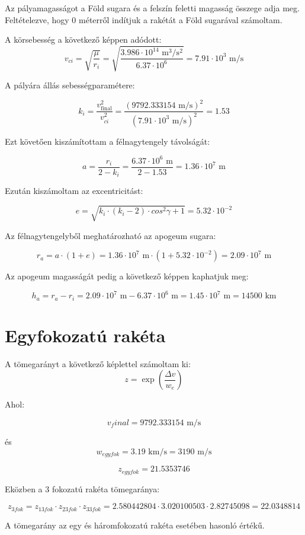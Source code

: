 \documentclass[a4paper,12pt]{article}
\begin{document}
Az pályamagasságot a Föld sugara és a felszín feletti magasság összege adja meg. Feltételezve, hogy 0 méterről indítjuk a rakétát a Föld sugarával számoltam.

A körsebesség a következő képpen adódott:
\[
  v_{ci} = \sqrt{\frac{\mu}{r_i}} = \sqrt{\frac{3.986 \cdot 10^{14} \text{ m}^3/\text{s}^2}{6.37 \cdot 10^6}} = 7.91 \cdot 10^3 \text{ m/s}
\]

A pályára állás sebességparamétere:

\[
  k_i = \frac{v_{\text{final}}^2}{v_{ci}^2} = \frac{(9792.333154 \text{ m/s})^2}{(7.91 \cdot 10^3 \text{ m/s})^2} = 1.53
\]

Ezt követően kiszámítottam a félnagytengely távolságát:

\[
  a = \frac{r_i}{2 - k_i} = \frac{6.37 \cdot 10^6 \text{ m}}{2 - 1.53 } = 1.36 \cdot 10^7 \text{ m}
\]

Ezután kiszámoltam az excentricitást:

\[
  e = \sqrt{k_i \cdot (k_i - 2) \cdot cos^2\gamma + 1} = 5.32 \cdot 10^{-2}
\]

Az félnagytengelyből meghatározható az apogeum sugara:

\[
  r_a = a \cdot (1 + e) = 1.36 \cdot 10^7 \text{ m} \cdot (1 + 5.32 \cdot 10^{-2}) = 2.09 \cdot 10^7 \text{ m}
\]

Az apogeum magasságát pedig a következő képpen kaphatjuk meg:

\[
  h_a = r_a - r_i = 2.09 \cdot 10^7 \text{ m} - 6.37 \cdot 10^6 \text{ m} = 1.45 \cdot 10^7 \text{ m} = 14500 \text{ km}
\]


\section{Egyfokozatú rakéta}

A tömegarányt a következő képlettel számoltam ki:
\[
z = \exp\left(\frac{\Delta v}{w_e}\right)
\]

Ahol:

\[
v_final = 9792.333154 \text{ m/s}
\]

és
\[
w_{egyfok} = 3.19 \text{ km/s} = 3190 \text{ m/s}
\]

\[
z_{egyfok} = 21.5353746
\]

Eközben a 3 fokozatú rakéta tömegaránya:

\[
  z_{3fok} = z_{13fok} \cdot z_{23fok} \cdot z_{33fok} = 2.580442804 \cdot 3.020100503 \cdot 2.82745098 = 22.0348814
\]

A tömegarány az egy és háromfokozatú rakéta esetében hasonló értékű.
\end{document}
